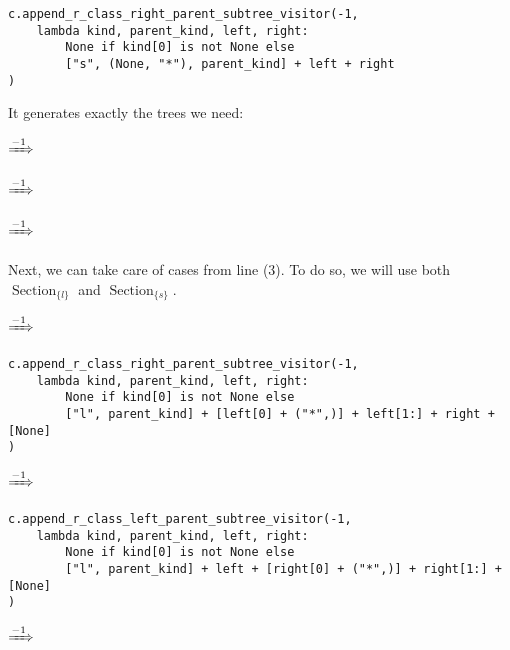 \documentclass[final]{article}
\theoremstyle{definition}
\theoremstyle{definition}
\theoremstyle{remark}
\DeclareMathOperator{\tSection}{\text{Section}}
\newcommand{\includeinlinescaledsvg}[3]{\begin{minipage}{#1\textwidth}\begin{center}\end{center}\end{minipage}}
\begin{document}
\begin{lstlisting}
c.append_r_class_right_parent_subtree_visitor(-1,
    lambda kind, parent_kind, left, right:
        None if kind[0] is not None else
        ["s", (None, "*"), parent_kind] + left + right
)
\end{lstlisting}

It generates exactly the trees we need:

\begin{center}
    \includeinlinescaledsvg{.24}{.4}{lambda__trees_110__0_base}%
    \(\xRightarrow{-1}\)%
    \includeinlinescaledsvg{.24}{.4}{lambda__trees_110__0}%

    \includeinlinescaledsvg{.24}{.4}{lambda__trees_110__1_base}%
    \(\xRightarrow{-1}\)%
    \includeinlinescaledsvg{.24}{.4}{lambda__trees_110__1}%
    \includeinlinescaledsvg{.24}{.4}{lambda__trees_110__2_base}%
    \(\xRightarrow{-1}\)%
    \includeinlinescaledsvg{.24}{.4}{lambda__trees_110__2}%
\end{center}

Next, we can take care of cases from line (3). To do so, we will use both \(\tSection_{\{l\}}\) and \(\tSection_{\{s\}}\).

\begin{center}
    \includeinlinescaledsvg{.4}{.7}{lambda__transformations__004a}%
    \(\xRightarrow{-1}\)%
    \includeinlinescaledsvg{.4}{.7}{lambda__transformations__004b}%
\end{center}

\begin{lstlisting}
c.append_r_class_right_parent_subtree_visitor(-1,
    lambda kind, parent_kind, left, right:
        None if kind[0] is not None else
        ["l", parent_kind] + [left[0] + ("*",)] + left[1:] + right + [None]
)
\end{lstlisting}

\begin{center}
    \includeinlinescaledsvg{.4}{.7}{lambda__transformations__005a}%
    \(\xRightarrow{-1}\)%
    \includeinlinescaledsvg{.4}{.7}{lambda__transformations__005b}%
\end{center}

\begin{lstlisting}
c.append_r_class_left_parent_subtree_visitor(-1,
    lambda kind, parent_kind, left, right:
        None if kind[0] is not None else
        ["l", parent_kind] + left + [right[0] + ("*",)] + right[1:] + [None]
)
\end{lstlisting}

\begin{center}
    \includeinlinescaledsvg{.4}{.7}{lambda__transformations__006a}%
    \(\xRightarrow{-1}\)%
    \includeinlinescaledsvg{.4}{.7}{lambda__transformations__006b}%
\end{center}
\end{document}

